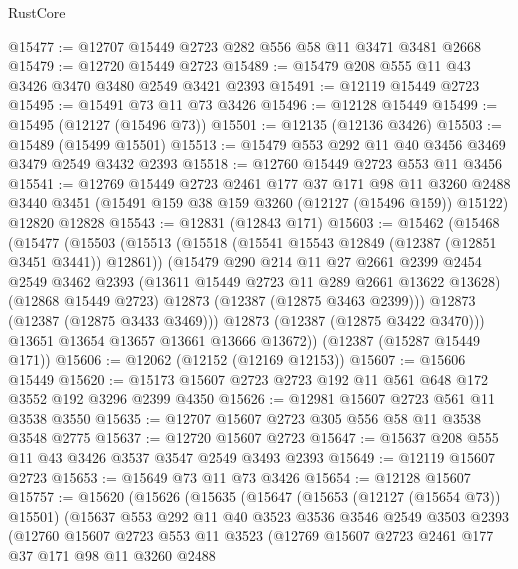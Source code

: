 \begin{lexlean}{RustCore}
\begin{coremodule}
@15477 := @12707 @15449 @2723 @282 @556 @58 @11 @3471 @3481 @2668
@15479 := @12720 @15449 @2723
@15489 := @15479 @208 @555 @11 @43 @3426 @3470 @3480 @2549 @3421 @2393
@15491 := @12119 @15449 @2723
@15495 := @15491 @73 @11 @73 @3426
@15496 := @12128 @15449
@15499 := @15495 (@12127 (@15496 @73))
@15501 := @12135 (@12136 @3426)
@15503 := @15489 (@15499 @15501)
@15513 := @15479 @553 @292 @11 @40 @3456 @3469 @3479 @2549 @3432 @2393
@15518 := @12760 @15449 @2723 @553 @11 @3456
@15541 := @12769
    @15449
    @2723
    @2461
    @177
    @37
    @171
    @98
    @11
    @3260
    @2488
    @3440
    @3451
    (@15491 @159 @38 @159 @3260 (@12127 (@15496 @159)) @15122)
    @12820
    @12828
@15543 := @12831 (@12843 @171)
@15603 := @15462
    (@15468
      (@15477
        (@15503
          (@15513
            (@15518 (@15541 @15543 @12849 (@12387 (@12851 @3451 @3441)) @12861))
            (@15479
              @290
              @214
              @11
              @27
              @2661
              @2399
              @2454
              @2549
              @3462
              @2393
              (@13611 @15449 @2723 @11 @289 @2661 @13622 @13628)
              (@12868 @15449 @2723)
              @12873
              (@12387 (@12875 @3463 @2399)))
            @12873
            (@12387 (@12875 @3433 @3469)))
          @12873
          (@12387 (@12875 @3422 @3470)))
        @13651
        @13654
        @13657
        @13661
        @13666
        @13672))
    (@12387 (@15287 @15449 @171))
@15606 := @12062 (@12152 (@12169 @12153))
@15607 := @15606 @15449
@15620 := @15173 @15607 @2723 @2723 @192 @11 @561 @648 @172 @3552 @192 @3296 @2399 @4350
@15626 := @12981 @15607 @2723 @561 @11 @3538 @3550
@15635 := @12707 @15607 @2723 @305 @556 @58 @11 @3538 @3548 @2775
@15637 := @12720 @15607 @2723
@15647 := @15637 @208 @555 @11 @43 @3426 @3537 @3547 @2549 @3493 @2393
@15649 := @12119 @15607 @2723
@15653 := @15649 @73 @11 @73 @3426
@15654 := @12128 @15607
@15757 := @15620
    (@15626
      (@15635
        (@15647
          (@15653 (@12127 (@15654 @73)) @15501)
          (@15637
            @553
            @292
            @11
            @40
            @3523
            @3536
            @3546
            @2549
            @3503
            @2393
            (@12760
              @15607
              @2723
              @553
              @11
              @3523
              (@12769
                @15607
                @2723
                @2461
                @177
                @37
                @171
                @98
                @11
                @3260
                @2488

\end{coremodule}
\end{lexlean}
